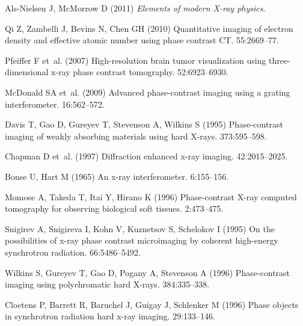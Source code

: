 \documentclass{pnastwo}
\begin{document}
\begin{article}
\begin{thebibliography}{10}
\end{thebibliography}
\begin{thebibliography}{10}

Als-Nielsen J, McMorrow D (2011) {\em {Elements of modern X-ray physics}}.

Qi Z, Zambelli J, Bevins N, Chen GH (2010) {Quantitative imaging of electron
  density and effective atomic number using phase contrast CT.}
 55:2669--77.

Pfeiffer F et~al. (2007) {High-resolution brain tumor visualization using
  three-dimensional x-ray phase contrast tomography.}
 52:6923--6930.

McDonald SA et~al. (2009) {Advanced phase-contrast imaging using a grating
  interferometer}.
 16:562--572.

Davis T, Gao D, Gureyev T, Stevenson A, Wilkins S (1995) {Phase-contrast
  imaging of weakly absorbing materials using hard X-rays}.
 373:595--598.

Chapman D et~al. (1997) {Diffraction enhanced x-ray imaging}.
 42:2015--2025.

Bonse U, Hart M (1965) {An x-ray interferometer}.
 6:155--156.

Momose A, Takeda T, Itai Y, Hirano K (1996) {Phase-contrast X-ray computed
  tomography for observing biological soft tissues}.
 2:473--475.

Snigirev A, Snigireva I, Kohn V, Kuznetsov S, Schelokov I (1995) {On the
  possibilities of x-ray phase contrast microimaging by coherent high-energy
  synchrotron radiation}.
 66:5486--5492.

Wilkins S, Gureyev T, Gao D, Pogany A, Stevenson A (1996) {Phase-contrast
  imaging using polychromatic hard X-rays}.
 384:335--338.

Cloetens P, Barrett R, Baruchel J, Guigay J, Schlenker M (1996) {Phase objects
  in synchrotron radiation hard x-ray imaging}.
 29:133--146.


\end{thebibliography}
\end{article}
\end{document}
